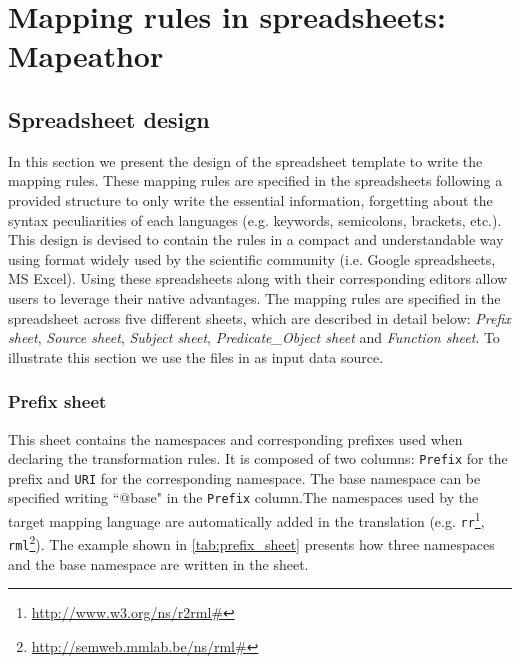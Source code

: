 \section{Mapping rules in spreadsheets: Mapeathor}
\label{sec:chp5_mapeathor}


\subsection{Spreadsheet design}


In this section we present the design of the spreadsheet template to write the mapping rules. 
These mapping rules are specified in the spreadsheets following a provided structure to only write the essential information, forgetting about the syntax peculiarities of each languages (e.g. keywords, semicolons, brackets, etc.).
This design is devised to contain the rules in a compact and understandable way using format widely used by the scientific community (i.e. Google spreadsheets, MS Excel). 
Using these spreadsheets along with their corresponding editors allow users to leverage their native advantages.
The mapping rules are specified in the spreadsheet across five different sheets, which are described in detail below: \textit{Prefix sheet}, \textit{Source sheet}, \textit{Subject sheet}, \textit{Predicate\_Object sheet} and \textit{Function sheet}. To illustrate this section we use the files in  as input data source.


\subsubsection{Prefix sheet} 
This sheet contains the namespaces and corresponding prefixes used when declaring the transformation rules. 
It is composed of two columns: \texttt{Prefix} for the prefix and \texttt{URI} for the corresponding namespace. The base namespace can be specified writing ``@base" in the \texttt{Prefix} column.The namespaces used by the target mapping language are automatically added in the translation (e.g. \texttt{rr}\footnote{\url{http://www.w3.org/ns/r2rml\#}}, \texttt{rml}\footnote{\url{http://semweb.mmlab.be/ns/rml\#}}).
The example shown in \cref{tab:prefix_sheet} presents how three namespaces and the base namespace are written in the sheet. 

